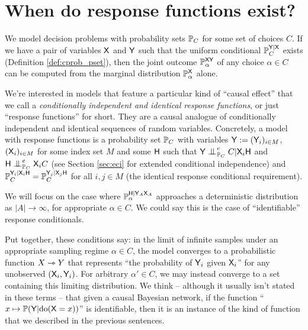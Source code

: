 
\section{When do response functions exist?}\label{sec:response_functions}

We model decision problems with probability sets $\mathbb{P}_C$ for some set of choices $C$. If we have a pair of variables $\mathsf{X}$ and $\mathsf{Y}$ such that the uniform conditional $\mathbb{P}_C^{\mathsf{Y}|\mathsf{X}}$ exists (Definition \ref{def:cprob_pset}), then the joint outcome $\mathbb{P}_\alpha^{\mathsf{XY}}$ of any choice $\alpha\in C$ can be computed from the marginal distribution $\mathbb{P}_\alpha^{\mathsf{X}}$ alone.

We're interested in models that feature a particular kind of ``causal effect'' that we call a \emph{conditionally independent and identical response functions}, or just ``response functions'' for short. They are a causal analogue of conditionally independent and identical sequences of random variables. Concretely, a model with response functions is a probability set $\mathbb{P}_C$ with variables $\mathsf{Y}:=(\mathsf{Y}_i)_{i\in M}$, $(\mathsf{X}_i)_{i\in M}$ for some index set $M$ and some $\mathsf{H}$ such that $\RV{Y} \CI_{\prob{P}_C}^e C|\RV{X}_i\RV{H}$ and $\RV{H}\CI_{\prob{P}_C}^e \RV{X}_i C$ (see Section \ref{sec:eci} for extended conditional independence) and $\mathbb{P}_C^{\mathsf{Y}_i|\mathsf{X}_i\mathsf{H}}=\mathbb{P}_C^{\mathsf{Y}_j|\mathsf{X}_j\mathsf{H}}$ for all $i,j\in M$ (the identical response conditional requirement).

We will focus on the case where $\mathbb{P}_\alpha^{\mathsf{H}|\mathsf{Y}_A\mathsf{X}_A}$ approaches a deterministic distribution as $|A|\to \infty$, for appropriate $\alpha\in C$. We could say this is the case of ``identifiable'' response conditionals.

Put together, these conditions say: in the limit of infinite samples under an appropriate sampling regime $\alpha\in C$, the model converges to a probabilistic function $X\rightarrowtriangle Y$ that represents ``the probability of $\mathsf{Y}_i$ given $\mathsf{X}_i$'' for any unobserved $(\mathsf{X}_i,\mathsf{Y}_i)$. For arbitrary $\alpha'\in C$, we may instead converge to a set containing this limiting distribution. We think -- although it usually isn't stated in these terms -- that given a causal Bayesian network, if the function ``$x\mapsto \mathbb{P}(\mathsf{Y}|\mathrm{do}(\mathsf{X}=x))$'' is identifiable, then it is an instance of the kind of function that we described in the previous sentences.

